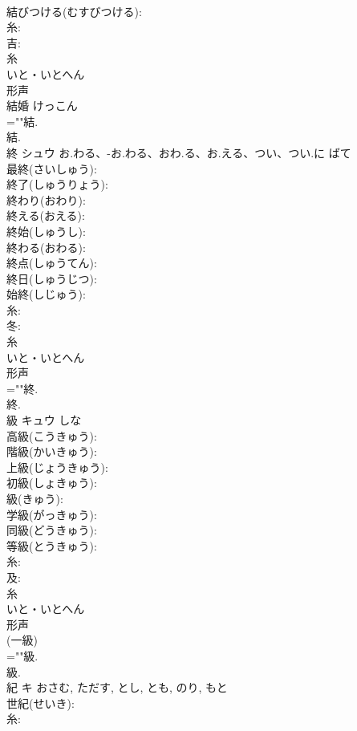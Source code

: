 \documentclass[8pt]{extreport}
\begin{document}
\begin{CJK}{UTF8}{min}
\\	結びつける(むすびつける): 
\\	糸: 
\\	吉: 
\\	糸	
\\	いと・いとへん	
\\	形声 
\\	結婚 けっこん 
\\	=""結.
\\	結.
\\	終	シュウ	お.わる、-お.わる、おわ.る、お.える、つい、つい.に	ばて	
\\	最終(さいしゅう): 
\\	終了(しゅうりょう): 
\\	終わり(おわり): 
\\	終える(おえる): 
\\	終始(しゅうし): 
\\	終わる(おわる): 
\\	終点(しゅうてん): 
\\	終日(しゅうじつ): 
\\	始終(しじゅう): 
\\	糸: 
\\	冬: 
\\	糸	
\\	いと・いとへん	
\\	形声 
\\	=""終.
\\	終.
\\	級	キュウ		しな	
\\	高級(こうきゅう): 
\\	階級(かいきゅう): 
\\	上級(じょうきゅう): 
\\	初級(しょきゅう): 
\\	級(きゅう): 
\\	学級(がっきゅう): 
\\	同級(どうきゅう): 
\\	等級(とうきゅう): 
\\	糸: 
\\	及: 
\\	糸	
\\	いと・いとへん	
\\	形声 
\\	(一級) 
\\	=""級.
\\	級.
\\	紀	キ		おさむ, ただす, とし, とも, のり, もと	
\\	世紀(せいき): 
\\	糸: 

\end{CJK}
\end{document}
